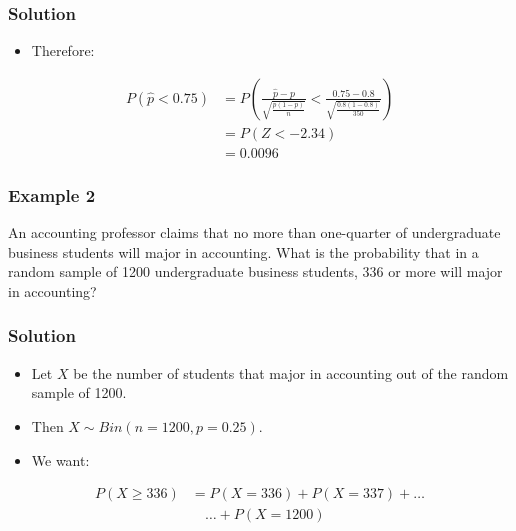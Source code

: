 \documentclass[14pt]{beamer}
\begin{document}
\begin{frame}
	\frametitle{Solution}
	
	\begin{itemize}[label={\color{blue}$\blacktriangleright$}]
		\item Therefore:
	\end{itemize}
	
	
	\begin{align*}
		P(\hat{p} < 0.75) &= P\left(\frac{\hat{p} - p}{\sqrt{\frac{p(1-p)}{n}}} < \frac{0.75 - 0.8}{\sqrt{\frac{0.8(1-0.8)}{350}}}\right) \\[1ex]
		&= P(Z < -2.34) \\[1ex]
		&= 0.0096
	\end{align*}
	
\end{frame}
\begin{frame}
	\frametitle{Example 2}
	
An accounting professor claims that no more than one-quarter of undergraduate business students will major in accounting. What is the probability that in a random sample of 1200 undergraduate business students, 336 or more will major in accounting?

\end{frame}

\begin{frame}
	\frametitle{Solution}
	
	\begin{itemize}[label={\color{blue}$\blacktriangleright$}]
		\item Let $X$ be the number of students that major in accounting out of the random sample of 1200.
		\item Then $X \sim Bin(n = 1200, p = 0.25)$.
		\item We want:
	\end{itemize}

	
	\begin{align*}
		P(X \geq 336) &= P(X = 336) + P(X = 337) + \ldots \\
		&\quad \ldots + P(X = 1200)
	\end{align*}
	
\end{frame}
\end{document}
